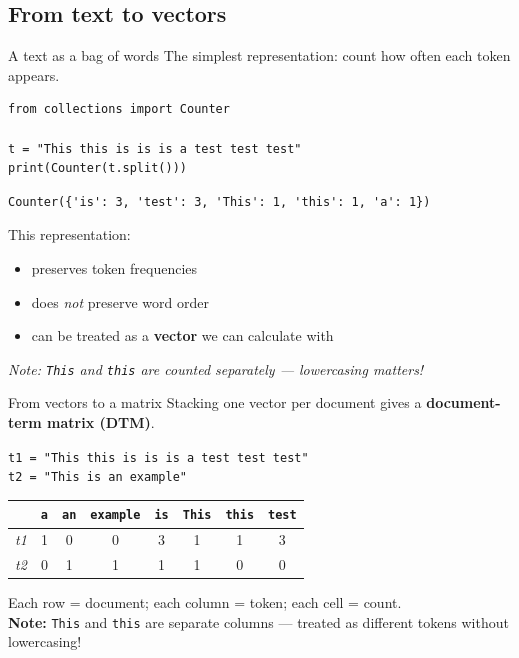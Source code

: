 \documentclass[handout]{beamer}
\begin{document}
\subsection{From text to vectors}

\begin{frame}[fragile]{A text as a bag of words}
The simplest representation: count how often each token appears.

\begin{verbatim}
from collections import Counter

t = "This this is is is a test test test"
print(Counter(t.split()))
\end{verbatim}

\begin{verbatim}
Counter({'is': 3, 'test': 3, 'This': 1, 'this': 1, 'a': 1})
\end{verbatim}

\pause
This representation:
\begin{itemize}
    \item preserves token frequencies
    \item does \emph{not} preserve word order
    \item can be treated as a \textbf{vector} we can calculate with
\end{itemize}

\small \emph{Note: \texttt{This} and \texttt{this} are counted separately --- lowercasing matters!}
\end{frame}

\begin{frame}{From vectors to a matrix}
Stacking one vector per document gives a \textbf{document-term matrix (DTM)}.

\vspace{0.5em}
\texttt{t1 = "This this is is is a test test test"}\\
\texttt{t2 = "This is an example"}

\vspace{0.5em}
\begin{tabular}{|l|c|c|c|c|c|c|c|}
    \hline
    & \texttt{a} & \texttt{an} & \texttt{example} & \texttt{is} & \texttt{This} & \texttt{this} & \texttt{test} \\
    \hline
    \emph{t1} & 1 & 0 & 0 & 3 & 1 & 1 & 3 \\
    \emph{t2} & 0 & 1 & 1 & 1 & 1 & 0 & 0 \\
    \hline
\end{tabular}

\vspace{0.5em}
\small Each row = document; each column = token; each cell = count.\\
\textbf{Note:} \texttt{This} and \texttt{this} are separate columns --- treated as different tokens without lowercasing!
\end{frame}
\end{document}
